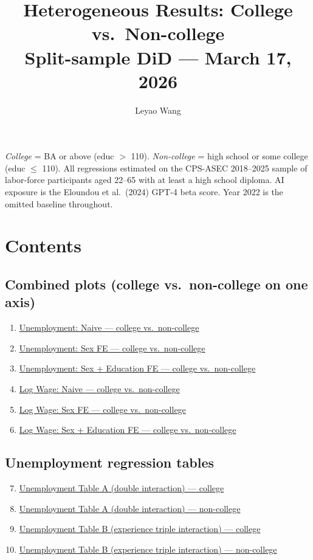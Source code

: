 \documentclass[11pt]{article}
\title{Heterogeneous Results: College vs.\ Non-college\\
       \large Split-sample DiD --- March 17, 2026}
\author{Leyao Wang}
\date{}
\begin{document}
\maketitle
\thispagestyle{empty}

\noindent\textit{College} = BA or above (educ $>$ 110). \textit{Non-college} = high school or some college (educ $\leq$ 110). All regressions estimated on the CPS-ASEC 2018--2025 sample of labor-force participants aged 22--65 with at least a high school diploma. AI exposure is the Eloundou et al.\ (2024) GPT-4 beta score. Year 2022 is the omitted baseline throughout.

\bigskip

\section*{Contents}

\subsection*{Combined plots (college vs.\ non-college on one axis)}
\begin{enumerate}
  \item \hyperref[fig:unemp_naive_colComb]{Unemployment: Naive --- college vs.\ non-college}
  \item \hyperref[fig:unemp_sexFE_colComb]{Unemployment: Sex FE --- college vs.\ non-college}
  \item \hyperref[fig:unemp_sexeducFE_colComb]{Unemployment: Sex + Education FE --- college vs.\ non-college}
  \item \hyperref[fig:lw_naive_colComb]{Log Wage: Naive --- college vs.\ non-college}
  \item \hyperref[fig:lw_sexFE_colComb]{Log Wage: Sex FE --- college vs.\ non-college}
  \item \hyperref[fig:lw_sexeducFE_colComb]{Log Wage: Sex + Education FE --- college vs.\ non-college}
\end{enumerate}

\subsection*{Unemployment regression tables}
\begin{enumerate}\setcounter{enumi}{6}
  \item \hyperref[tab:unemp_A_col]{Unemployment Table A (double interaction) --- college}
  \item \hyperref[tab:unemp_A_noncol]{Unemployment Table A (double interaction) --- non-college}
  \item \hyperref[tab:unemp_B_col]{Unemployment Table B (experience triple interaction) --- college}
  \item \hyperref[tab:unemp_B_noncol]{Unemployment Table B (experience triple interaction) --- non-college}
\end{enumerate}
\end{document}
